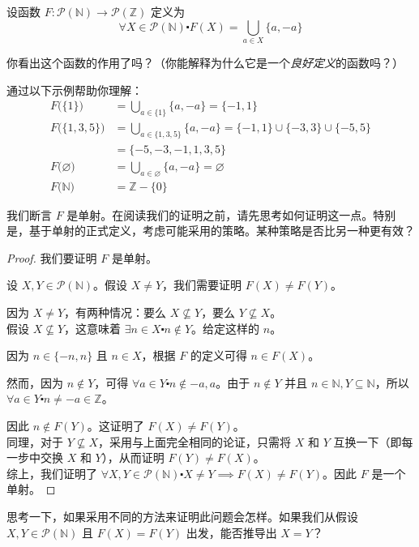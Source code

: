 \begin{example}
    设函数 $F : \mathcal{P}(\mathbb{N}) \to \mathcal{P}(\mathbb{Z})$ 定义为
    \[\forall X \in \mathcal{P}(\mathbb{N}) \centerdot F(X) = \bigcup_{a \in X} \{a, -a\}\]

    你看出这个函数的作用了吗？（你能解释为什么它是一个\emph{良好定义}的函数吗？）

    通过以下示例帮助你理解：
    \begin{align*}
        F\big(\{1\}\big)       & = \bigcup_{a \in \{1\}} \{a, -a\} = \{-1,1\}                                 \\
        F\big(\{1,3,5\}\big)   & = \bigcup_{a \in \{1,3,5\}} \{a, -a\} = \{-1,1\} \cup \{-3,3\} \cup \{-5,5\} \\
                               & = \{-5,-3,-1,1,3,5\}                                                         \\
        F\big(\varnothing\big) & = \bigcup_{a \in \varnothing} \{a, -a\} = \varnothing                        \\
        F\big(\mathbb{N}\big)  & = \mathbb{Z} - \{0\}
    \end{align*}

    我们断言 $F$ 是单射。在阅读我们的证明之前，请先思考如何证明这一点。特别是，基于单射的正式定义，考虑可能采用的策略。某种策略是否比另一种更有效？

    \begin{proof}
        我们要证明 $F$ 是单射。

        设 $X,Y \in \mathcal{P}(\mathbb{N})$。假设 $X \ne Y$，我们需要证明 $F(X) \ne F(Y)$。

        因为 $X \ne Y$，有两种情况：要么 $X \nsubseteq Y$，要么 $Y \nsubseteq X$。\\

        假设 $X \nsubseteq Y$，这意味着 $\exists n \in X \centerdot n \notin Y$。给定这样的 $n$。

        因为 $n \in \{-n, n\}$ 且 $n \in X$，根据 $F$ 的定义可得 $n \in F(X)$。

        然而，因为 $n \notin Y$，可得 $\forall a \in Y \centerdot n \notin {-a, a}$。由于 $n \notin Y$ 并且 $n \in \mathbb{N}, Y \subseteq \mathbb{N}$，所以 $\forall a \in Y \centerdot n \ne -a \in \mathbb{Z}$。

        因此 $n \notin F(Y)$。这证明了 $F(X) \ne F(Y)$。\\

        同理，对于 $Y \nsubseteq X$，采用与上面完全相同的论证，只需将 $X$ 和 $Y$ 互换一下（即每一步中交换 $X$ 和 $Y$），从而证明 $F(Y) \ne F(X)$。\\

        综上，我们证明了 $\forall X, Y \in \mathcal{P}(\mathbb{N}) \centerdot X \ne Y \implies F(X) \ne F(Y)$。因此 $F$ 是一个单射。
    \end{proof}

    思考一下，如果采用不同的方法来证明此问题会怎样。如果我们从假设 $X, Y \in \mathcal{P}(\mathbb{N})$ 且 $F(X) = F(Y)$ 出发，能否推导出 $X = Y$？
\end{example}